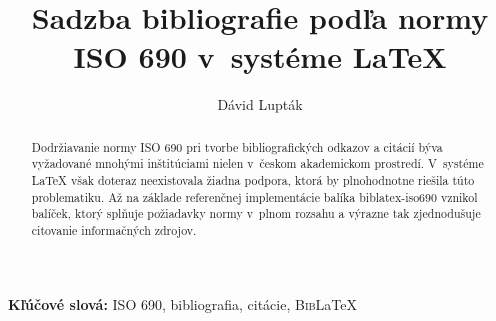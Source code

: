 \documentclass{csbulletin}
\newcommand\BibLaTeX{\textsc{Bib}\LaTeX}
\begin{document}

\title{Sadzba bibliografie podľa normy ISO 690 v~systéme \LaTeX}
\author{Dávid Lupták}
\maketitle

\begin{abstract}
Dodržiavanie normy ISO 690 pri tvorbe bibliografických odkazov
a citácií býva vyžadované mnohými inštitúciami nielen v~českom
akademickom prostredí. V~systéme \LaTeX{} však doteraz neexistovala
žiadna podpora, ktorá by plnohodnotne riešila túto problematiku. Až
na základe referenčnej implementácie balíka \textsf{biblatex-iso690}
vznikol balíček, ktorý splňuje požiadavky normy v~plnom rozsahu
a výrazne tak zjednodušuje citovanie informačných zdrojov.
\end{abstract}

\medskip\par\textbf{Kľúčové slová:}
ISO 690, bibliografia, citácie, \BibLaTeX
\end{document}
